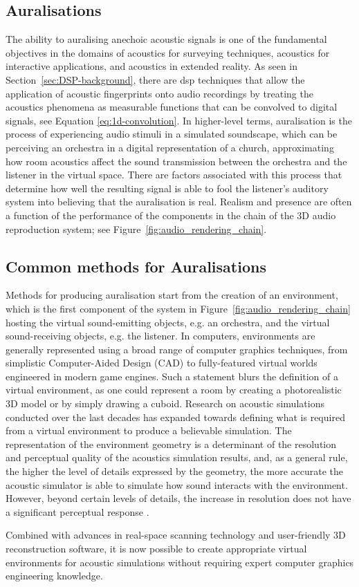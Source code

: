 \subsection{Auralisations}
The ability to auralising anechoic acoustic signals is one of the fundamental objectives in the domains of acoustics for surveying techniques, acoustics for interactive applications, and acoustics in extended reality. As seen in Section~\ref{sec:DSP-background}, there are \acrshort{dsp} techniques that allow the application of acoustic fingerprints onto audio recordings by treating the acoustics phenomena as measurable functions that can be convolved to digital signals, see Equation \ref{eq:1d-convolution}. In higher-level terms, auralisation is the process of experiencing audio stimuli in a simulated soundscape, which can be perceiving an orchestra in a digital representation of a church, approximating how room acoustics affect the sound transmission between the orchestra and the listener in the virtual space. There are factors associated with this process that determine how well the resulting signal is able to fool the listener's auditory system into believing that the auralisation is real. Realism and presence are often a function of the performance of the components in the chain of the 3D audio reproduction system; see Figure~\ref{fig:audio_rendering_chain}.

\subsection{Common methods for Auralisations}
Methods for producing auralisation start from the creation of an environment, which is the first component of the system in Figure~\ref{fig:audio_rendering_chain} hosting the virtual sound-emitting objects, e.g. an orchestra, and the virtual sound-receiving objects, e.g. the listener. In computers, environments are generally represented using a broad range of computer graphics techniques, from simplistic Computer-Aided Design (CAD) to fully-featured virtual worlds engineered in modern game engines. Such a statement blurs the definition of a virtual environment, as one could represent a room by creating a photorealistic 3D model or by simply drawing a cuboid. Research on acoustic simulations conducted over the last decades has expanded towards defining what is required from a virtual environment to produce a believable simulation. The representation of the environment geometry is a determinant of the resolution and perceptual quality of the acoustics simulation results, and, as a general rule, the higher the level of details expressed by the geometry, the more accurate the acoustic simulator is able to simulate how sound interacts with the environment. However, beyond certain levels of details, the increase in resolution does not have a significant perceptual response \cite{pelzer2010frequency}.\par
Combined with advances in real-space scanning technology and user-friendly 3D reconstruction software, it is now possible to create appropriate virtual environments for acoustic simulations without requiring expert computer graphics engineering knowledge.\par

